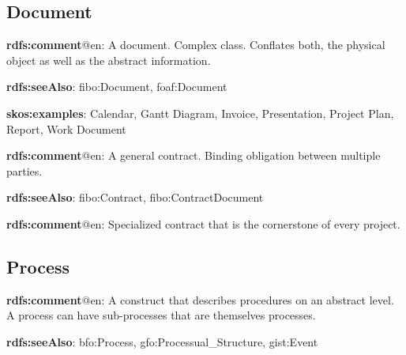 \documentclass[a4paper, DIV=13, BCOR=0cm]{scrbook}
\begin{document}
\subsection{Document}
\begin{mdframed}[style=onto, frametitle={Document}]
	{%
		\begin{compactitem}
			\item \textbf{rdfs:comment}@en: A document. Complex class. Conflates both, the physical object as well as the abstract information.
			\item \textbf{rdfs:seeAlso}: fibo:Document, foaf:Document
			\item \textbf{skos:examples}: Calendar, Gantt Diagram, Invoice, Presentation, Project Plan, Report, Work Document
		\end{compactitem}
	} %
\end{mdframed}

\begin{mdframed}[style=onto-1, frametitle={Contract}]
	{%
		\begin{compactitem}
			\item \textbf{rdfs:comment}@en: A general contract. Binding obligation between multiple parties.
			\item \textbf{rdfs:seeAlso}: fibo:Contract, fibo:ContractDocument
		\end{compactitem}
	} %
\end{mdframed}

\begin{mdframed}[style=onto-2, frametitle={Project Contract}]
	{%
		\begin{compactitem}
			\item \textbf{rdfs:comment}@en: Specialized contract that is the cornerstone of every project.
		\end{compactitem}
	} %
\end{mdframed}

\subsection{Process}
\begin{mdframed}[style=onto, frametitle={Process}]
	{%
		\begin{compactitem}
			\item \textbf{rdfs:comment}@en: A construct that describes procedures on an abstract level. A process can have sub-processes that are themselves processes.
			\item \textbf{rdfs:seeAlso}: bfo:Process, gfo:Processual\_Structure, gist:Event
		\end{compactitem}
	} %
\end{mdframed}
\end{document}
